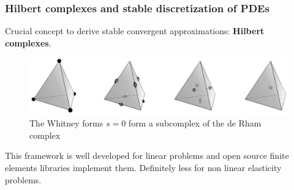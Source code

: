 \documentclass[aspectratio=169]{beamer}
\DeclareMathOperator*{\grad}{grad}
\renewcommand{\div}{\operatorname{div}}
\DeclareMathOperator*{\curl}{curl}
\begin{document}
\begin{frame}[fragile]\frametitle{Hilbert complexes and stable discretization of PDEs}
	Crucial concept to derive stable convergent approximations: \textbf{Hilbert complexes}.
	
	\begin{figure}
		\centering
			\includegraphics[width=.75\textwidth]{Whitney.png}
		\caption*{The Whitney forms $s=0$ form a subcomplex of the de Rham complex}
	\end{figure}
	This framework is well developed for linear problems  and open source finite elements libraries implement them. 	Definitely less for non linear elasticity problems. \vspace{.2cm}
	
\end{frame}
\end{document}
